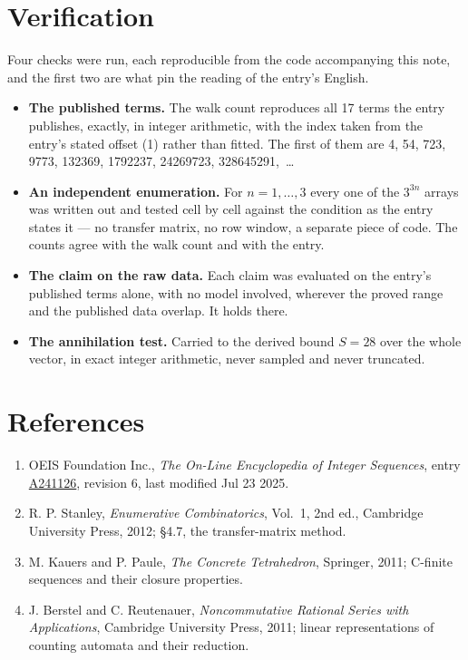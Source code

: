 \documentclass[11pt]{article}
\theoremstyle{definition}
\begin{document}
\section{Verification}

Four checks were run, each reproducible from the code accompanying this note, and the first two are what pin the reading of the entry's English.

\begin{itemize}

\item {\bfseries The published terms.} The walk count reproduces all 17 terms the entry publishes, exactly, in integer arithmetic, with the index taken from the entry's stated offset (1) rather than fitted. The first of them are 4, 54, 723, 9773, 132369, 1792237, 24269723, 328645291,~\dots

\item {\bfseries An independent enumeration.} For $n = 1,\dots,3$ every one of the $3^{3n}$ arrays was written out and tested cell by cell against the condition as the entry states it --- no transfer matrix, no row window, a separate piece of code. The counts agree with the walk count and with the entry.

\item {\bfseries The claim on the raw data.} Each claim was evaluated on the entry's published terms alone, with no model involved, wherever the proved range and the published data overlap. It holds there.

\item {\bfseries The annihilation test.} Carried to the derived bound $S = 28$ over the whole vector, in exact integer arithmetic, never sampled and never truncated.

\end{itemize}

\section{References}

\begin{enumerate}

\item OEIS Foundation Inc., \emph{The On-Line Encyclopedia of Integer Sequences}, entry \href{https://oeis.org/A241126}{A241126}, revision 6, last modified Jul 23 2025.

\item R. P. Stanley, \emph{Enumerative Combinatorics}, Vol.~1, 2nd ed., Cambridge University Press, 2012; \S4.7, the transfer-matrix method.

\item M. Kauers and P. Paule, \emph{The Concrete Tetrahedron}, Springer, 2011; C-finite sequences and their closure properties.

\item J. Berstel and C. Reutenauer, \emph{Noncommutative Rational Series with Applications}, Cambridge University Press, 2011; linear representations of counting automata and their reduction.

\end{enumerate}
\end{document}
